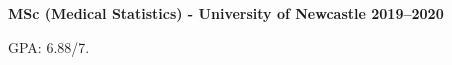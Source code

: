 \textbf{MSc (Medical Statistics) - University of Newcastle \hfill 2019--2020} \par
GPA: 6.88/7. \par